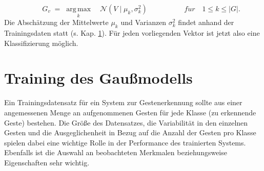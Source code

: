 \begin{equation} \label{finalClassification}
    \qquad \ G_v \; = \; {\underset {k}{\operatorname {arg\,max} }\quad
    \mathcal {N}(V\mid \mu_k ,\sigma^{2}_k)}\qquad \qquad \ \ \ \ \
    f\ddot{u}r\quad 1\leq k\leq |G|.
\end{equation}
Die Abschätzung der Mittelwerte $\mu_k$ und Varianzen $\sigma_k^2$ findet anhand der Trainingsdaten statt (s. Kap. \ref{Training}). Für jeden vorliegenden Vektor ist jetzt also eine Klassifizierung möglich. 

\section{Training des Gaußmodells} \label{Training}
Ein Trainingsdatensatz für ein System zur Gestenerkennung sollte aus einer angemessenen Menge an aufgenommenen Gesten für jede Klasse (zu erkennende Geste) bestehen. Die Größe des Datensatzes, die Variabilität in den einzelnen Gesten und die Ausgeglichenheit in Bezug auf die Anzahl der Gesten pro Klasse spielen dabei eine wichtige Rolle in der Performance des trainierten Systems. Ebenfalls ist die Auswahl an beobachteten Merkmalen beziehungsweise Eigenschaften sehr wichtig.~\cite{sampleSize}

